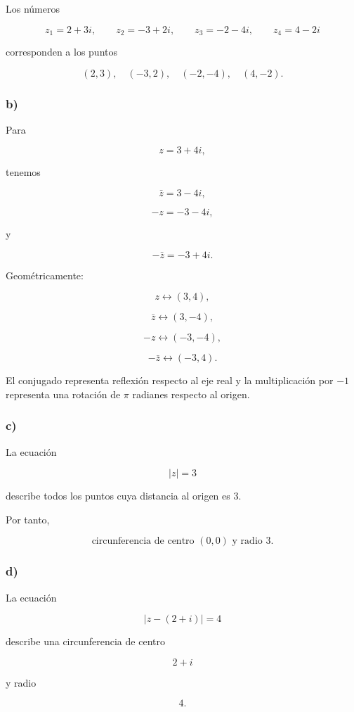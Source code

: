 \documentclass[12pt]{article}
\begin{document}
Los números

\[
z_1=2+3i,\qquad
z_2=-3+2i,\qquad
z_3=-2-4i,\qquad
z_4=4-2i
\]

corresponden a los puntos

\[
\boxed{
(2,3),\quad
(-3,2),\quad
(-2,-4),\quad
(4,-2)
}.
\]

\subsubsection*{b)}

Para

\[
z=3+4i,
\]

tenemos

\[
\bar z=3-4i,
\]

\[
-z=-3-4i,
\]

y

\[
-\bar z=-3+4i.
\]

Geométricamente:

\[
z\longleftrightarrow(3,4),
\]

\[
\bar z\longleftrightarrow(3,-4),
\]

\[
-z\longleftrightarrow(-3,-4),
\]

\[
-\bar z\longleftrightarrow(-3,4).
\]

El conjugado representa reflexión respecto al eje real y la
multiplicación por \(-1\) representa una rotación de \(\pi\) radianes
respecto al origen.

\subsubsection*{c)}

La ecuación

\[
|z|=3
\]

describe todos los puntos cuya distancia al origen es \(3\).

Por tanto,

\[
\boxed{
\text{circunferencia de centro }(0,0)
\text{ y radio }3
}.
\]

\subsubsection*{d)}

La ecuación

\[
|z-(2+i)|=4
\]

describe una circunferencia de centro

\[
2+i
\]

y radio

\[
4.
\]
\end{document}
